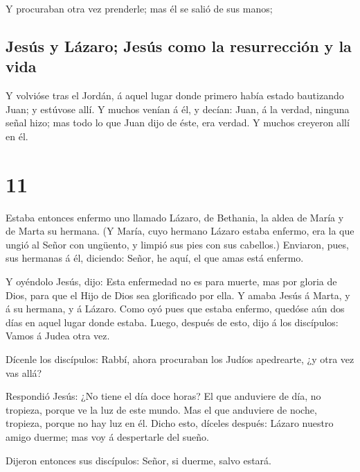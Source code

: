  Y procuraban otra vez prenderle; mas él se salió de sus
manos;

\hypertarget{jesuxfas-y-luxe1zaro-jesuxfas-como-la-resurrecciuxf3n-y-la-vida}{%
\subsection{Jesús y Lázaro; Jesús como la resurrección y la
vida}\label{jesuxfas-y-luxe1zaro-jesuxfas-como-la-resurrecciuxf3n-y-la-vida}}

 Y volvióse tras el Jordán, á aquel lugar donde primero
había estado bautizando Juan; y estúvose allí.  Y muchos
venían á él, y decían: Juan, á la verdad, ninguna señal hizo; mas todo
lo que Juan dijo de éste, era verdad.  Y muchos creyeron
allí en él.

\hypertarget{section-10}{%
\section{11}\label{section-10}}

 Estaba entonces enfermo uno llamado Lázaro, de Bethania,
la aldea de María y de Marta su hermana.  (Y María, cuyo
hermano Lázaro estaba enfermo, era la que ungió al Señor con ungüento, y
limpió sus pies con sus cabellos.)  Enviaron, pues, sus
hermanas á él, diciendo: Señor, he aquí, el que amas está enfermo.

 Y oyéndolo Jesús, dijo: Esta enfermedad no es para
muerte, mas por gloria de Dios, para que el Hijo de Dios sea glorificado
por ella.  Y amaba Jesús á Marta, y á su hermana, y á
Lázaro.  Como oyó pues que estaba enfermo, quedóse aún dos
días en aquel lugar donde estaba.  Luego, después de esto,
dijo á los discípulos: Vamos á Judea otra vez.

 Dícenle los discípulos: Rabbí, ahora procuraban los
Judíos apedrearte, ¿y otra vez vas allá?

 Respondió Jesús: ¿No tiene el día doce horas? El que
anduviere de día, no tropieza, porque ve la luz de este mundo.
 Mas el que anduviere de noche, tropieza, porque no hay
luz en él.  Dicho esto, díceles después: Lázaro nuestro
amigo duerme; mas voy á despertarle del sueño.

 Dijeron entonces sus discípulos: Señor, si duerme, salvo
estará.

